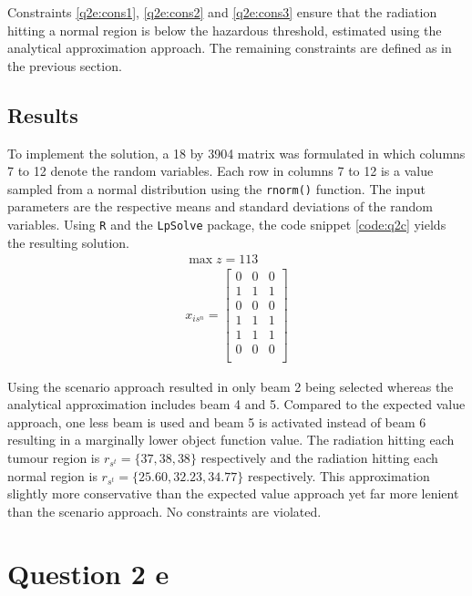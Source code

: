 \documentclass[a4paper,11pt]{article}
\begin{document}
Constraints \ref{q2e:cons1}, \ref{q2e:cons2} and \ref{q2e:cons3} ensure that the radiation hitting a normal region is below the hazardous threshold, estimated using the analytical approximation approach. The remaining constraints are defined as in the previous section.


\subsection{Results}

To implement the solution, a 18 by 3904 matrix was formulated in which columns 7 to 12 denote the random variables. Each row in columns 7 to 12 is a value sampled from a normal distribution using the \texttt{rnorm()} function. The input parameters are the respective means and standard deviations of the random variables. Using \texttt{R} and the \texttt{LpSolve} package, the code snippet \ref{code:q2c} yields the resulting solution.
\begin{align}
\max z = 113 \\
x_{is^n}=
	\begin{bmatrix}
    0  &  0  &  0 \\
    1  &  1  &  1 \\
    0  &  0  &  0 \\
    1  &  1  &  1 \\
    1  &  1  &  1 \\
    0  &  0   & 0 \\
\end{bmatrix}
\end{align}

Using the scenario approach resulted in only beam 2 being selected whereas the analytical approximation includes beam 4 and 5. Compared to the expected value approach, one less beam is used and beam 5 is activated instead of beam 6 resulting in a marginally lower object function value. The radiation hitting each tumour region is $r_{s^t}=\{37, 38, 38\}$ respectively and the radiation hitting each normal region is $r_{s^t}=\{25.60 ,32.23, 34.77\}$ respectively. This approximation slightly more conservative than the expected value approach yet far more lenient than the scenario approach. No constraints are violated.

\newpage

\section{Question 2 e}
\end{document}
